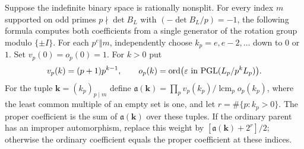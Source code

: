 \begin{theorem}\label{th:inertreal}
Suppose the indefinite binary space is rationally nonsplit. For every index \(m\) supported on odd primes \(p\nmid\det B_L\) with \((-\det B_L/p)=-1\), the following formula computes both coefficients from a single generator of the rotation group modulo \(\{\pm I\}\). For each \(p^e\Vert m\), independently choose \(k_p=e,e-2,\ldots\) down to \(0\) or \(1\). Set \(v_p(0)=o_p(0)=1\). For \(k>0\) put
\[
 v_p(k)=(p+1)p^{k-1},\qquad
 o_p(k)=\operatorname{ord}\bigl(\varepsilon\text{ in }
                     {\rm PGL}(L_p/p^k L_p)\bigr).
\]
For the tuple $\boldsymbol{k}=(k_p)_{p\mid m}$ define
\(\mathfrak a(\boldsymbol{k})=\prod_p v_p(k_p)/\operatorname{lcm}_p o_p(k_p)\),
where the least common multiple of an empty set is one, and let
\(r=\#\{p:k_p>0\}\).
The proper coefficient is the sum of $\mathfrak a(\boldsymbol{k})$ over these tuples. If the ordinary parent has an improper automorphism, replace this weight by
$[\mathfrak a(\boldsymbol{k})+2^r]/2$; otherwise the ordinary coefficient equals the proper coefficient at these indices.
\end{theorem}

